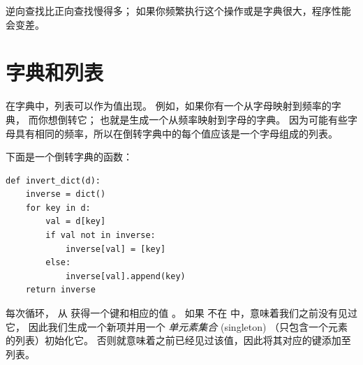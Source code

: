 逆向查找比正向查找慢得多； 如果你频繁执行这个操作或是字典很大，程序性能会变差。

\section{字典和列表}
\label{invert}


在字典中，列表可以作为值出现。
例如，如果你有一个从字母映射到频率的字典， 而你想倒转它；
也就是生成一个从频率映射到字母的字典。
因为可能有些字母具有相同的频率，所以在倒转字典中的每个值应该是一个字母组成的列表。

  


下面是一个倒转字典的函数：

\begin{lstlisting}
def invert_dict(d):
    inverse = dict()
    for key in d:
        val = d[key]
        if val not in inverse:
            inverse[val] = [key]
        else:
            inverse[val].append(key)
    return inverse
\end{lstlisting}

%

每次循环，  从  获得一个键和相应的值  。
如果  不在  中，意味着我们之前没有见过它，
因此我们生成一个新项并用一个 {\em 单元素集合} (singleton) （只包含一个元素的列表）初始化它。 否则就意味着之前已经见过该值，因此将其对应的键添加至列表。

